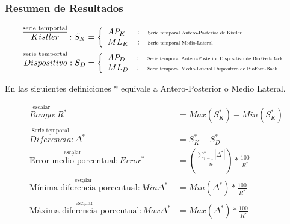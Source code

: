 \documentclass[12pt,a4paper]{article}
\newcommand{\nombreDispositivo}{Dispositivo de BioFeed-Back }
\begin{document}
\subsubsection{Resumen de Resultados}


\begin{tcolorbox}[colframe=black,title=Definición de ecuaciones,center title]	
		
	\begin{align}
		\overset{\underline{\textrm{serie temportal}}}{Kistler}:S_{K} &= \left\lbrace \begin{array}{lcl}
		AP_{K} & : & \scalebox{0.6}{\textrm{Serie temporal Antero-Posterior de Kistler}}\\
		ML_{K} & : & \scalebox{0.6}{\textrm{Serie temporal Medio-Lateral}}\\
		\end{array} \right. \label{eq:seriesKistler} \\
		\overset{\underline{\textrm{serie temportal}}}{Dispositivo}:S_{D} &= \left\lbrace \begin{array}{lcl}
		AP_{D} & : & \scalebox{0.6}{\textrm{Serie temporal Antero-Posterior \nombreDispositivo}}\\
		ML_{D} & : & \scalebox{0.6}{\textrm{Serie temporal Medio-Lateral \nombreDispositivo}}
		\end{array} \right. \label{eq:seriesDisposito}
	\end{align}
	
	En las siguientes definiciones $*$ equivale a Antero-Posterior o Medio Lateral.
	
	\begin{align} 
		\overset{\underline{\textrm{escalar}}}{Rango}:	R^{*}&=Max(S_{K}^{*})-Min(S_{K}^{*})\\
		\overset{\underline{\textrm{Serie temporal}}}{Diferencia}:	\Delta^{*}&=S_{K}^{*}-S_{D}^{*}\\
		\overset{\underline{\textrm{escalar}}}{\textrm{Error medio porcentual}}:	Error^{*}&=\left( \frac{\sum_{i=1}^{n}|\Delta^{*}|}{n} \right)*\frac{100}{R^{*}} \\
		\overset{\underline{\textrm{escalar}}}{\textrm{Mínima diferencia porcentual}}:	Min\Delta^{*}&=Min(\Delta^{*})*\frac{100}{R^{*}}\\
		\overset{\underline{\textrm{escalar}}}{\textrm{Máxima diferencia porcentual}}:	Max\Delta^{*}&=Max(\Delta^{*})*\frac{100}{R^{*}}
	\end{align}	
\end{tcolorbox}
\end{document}
